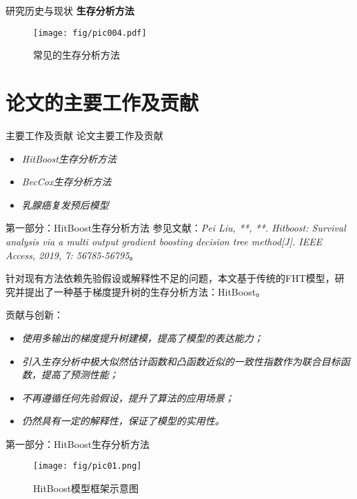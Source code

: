 \documentclass[10pt]{beamer}
\begin{document}
\begin{frame}{研究历史与现状}
  \textbf{生存分析方法}

  \begin{figure}[H]
    \centering
    \texttt{[image: fig/pic004.pdf]}
    \caption{常见的生存分析方法}
  \end{figure}
\end{frame}

\section{论文的主要工作及贡献}

\begin{frame}{主要工作及贡献}
  论文主要工作及贡献
  \begin{itemize}
    \item \textit{HitBoost生存分析方法}
    \item \textit{BecCox生存分析方法}
    \item \textit{乳腺癌复发预后模型}
  \end{itemize}
\end{frame}

\begin{frame}{第一部分：HitBoost生存分析方法}
  参见文献：\textit{Pei Liu, **, **. Hitboost: Survival analysis via a multi­ output gradient boosting decision tree method[J]. IEEE Access, 2019, 7: 56785-­56795}。

  针对现有方法依赖先验假设或解释性不足的问题，本文基于传统的FHT模型，研究并提出了一种基于梯度提升树的生存分析方法：HitBoost。
  
  贡献与创新：
  \begin{itemize}
    \item \textit{使用多输出的梯度提升树建模，提高了模型的表达能力；}
    \item \textit{引入生存分析中极大似然估计函数和凸函数近似的一致性指数作为联合目标函数，提高了预测性能；}
    \item \textit{不再遵循任何先验假设，提升了算法的应用场景；}
    \item \textit{仍然具有一定的解释性，保证了模型的实用性。}
  \end{itemize}
  
\end{frame}

\begin{frame}{第一部分：HitBoost生存分析方法}
  \begin{figure}[H]
    \centering
    \texttt{[image: fig/pic01.png]}
    \caption{HitBoost模型框架示意图}
  \end{figure}
  
\end{frame}
\end{document}
